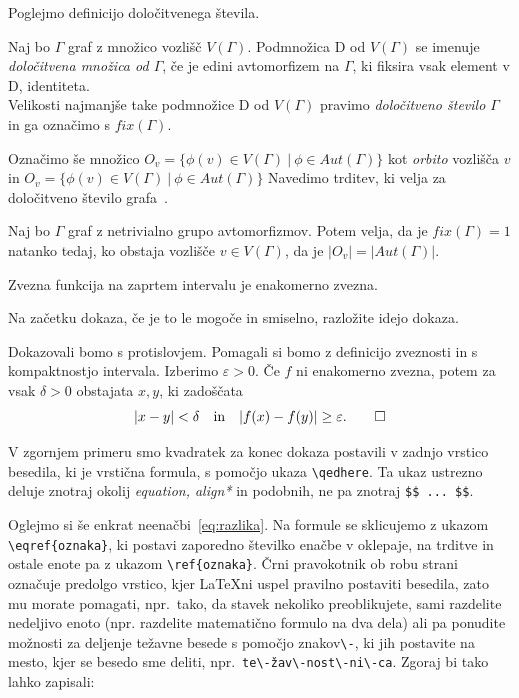 \documentclass[mat1, tisk]{fmfdelo}
\begin{document}
%
Poglejmo definicijo določitvenega števila.
%
\begin{definicija}
  Naj bo $\Gamma$ graf z množico vozlišč $V(\Gamma)$. Podmnožica D od $V(\Gamma)$ 
  se imenuje \emph{določitvena množica od $\Gamma$}, če je edini avtomorfizem na 
  $\Gamma$, ki fiksira vsak element v D, identiteta.\\
  Velikosti najmanjše take podmnožice D od $V(\Gamma)$ pravimo 
  \emph{določitveno število $\Gamma$} in ga označimo s $fix(\Gamma)$.
\end{definicija}
%
Označimo še množico 
$O_v = \{ \phi(v) \in V(\Gamma)~|~ \phi \in Aut(\Gamma) \}$ kot 
\emph{orbito} vozlišča $v$ in $O_v = \{ \phi(v) \in V(\Gamma)~|~ \phi \in Aut(\Gamma) \}$
Navedimo trditev, ki velja za določitveno število grafa~\cite{1erwin}.
%
\begin{trditev}
  Naj bo $\Gamma$ graf z netrivialno grupo avtomorfizmov. Potem velja, da 
  je $fix(\Gamma)=1$ natanko tedaj, ko obstaja vozlišče $v \in V(\Gamma)$, 
  da je $|O_v| = |Aut(\Gamma)|$.
\end{trditev}









\begin{izrek}\label{izr:enakomerno}
Zvezna funkcija na zaprtem intervalu je enakomerno zvezna.
\end{izrek}

\begin{dokaz}
Na začetku dokaza, če je to le mogoče in smiselno, razložite idejo dokaza.

Dokazovali bomo s protislovjem. Pomagali si bomo z definicijo zveznosti in s
kompaktnostjo intervala.  Izberimo $\varepsilon>0$. Če $f$ ni enakomerno
zvezna, potem za vsak $\delta>0$ obstajata $x, y$, ki zadoščata
\begin{equation}\label{eq:razlika}
  |x-y|<\delta\quad \text{in}\quad |f(x)-f(y)| \ge \varepsilon. \qedhere
\end{equation}
\end{dokaz}

V zgornjem primeru smo kvadratek za konec dokaza postavili v zadnjo vrstico
besedila, ki je vrstična formula, s pomočjo ukaza \verb|\qedhere|.  Ta ukaz
ustrezno deluje znotraj okolij \emph{equation, align*} in podobnih, ne pa
znotraj \verb|$$ ... $$|.

Oglejmo si še enkrat neenačbi~\eqref{eq:razlika}. Na formule se sklicujemo z
ukazom \verb|\eqref{oznaka}|, ki postavi zaporedno številko enačbe
v oklepaje, na trditve in ostale enote pa z ukazom \verb|\ref{oznaka}|. Črni
pravokotnik ob robu strani označuje predolgo vrstico, kjer \LaTeX ni uspel
pravilno postaviti besedila, zato mu morate pomagati, npr.\ tako, da stavek
nekoliko preoblikujete, sami razdelite nedeljivo enoto (npr. razdelite
matematično formulo na dva dela) ali pa ponudite možnosti za deljenje težavne
besede s pomočjo znakov\verb|\-|, ki jih postavite na mesto, kjer se besedo sme
deliti, npr.\  \verb|te\-žav\-nost\-ni\-ca|. Zgoraj bi tako lahko zapisali:
\end{document}

